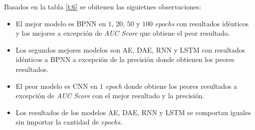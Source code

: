 Basados en la tabla \ref{t:6} se obitenen las siguietnes observaciones:
\begin{itemize}
	\item El mejor modelo es BPNN en $1$, $20$, $50$ y $100$ \textit{epochs} con resultados id\'{e}nticos y los mejores a excepci\'{o}n de \textit{AUC Score} que obtiene el peor resultado.
	\item Los segundos mejores modelos son AE, DAE, RNN y LSTM con resultados id\'{e}nticos a BPNN a excepci\'{o}n de la precisi\'{o}n donde obtienen los peores resultados.
	\item El peor modelo es CNN en $1$ \textit{epoch} donde obtiene los peores resultados a excepci\'{o}n de \textit{AUC Score} con el mejor resultado y la precisi\'{o}n.
	\item Los resultados de los modelos AE, DAE, RNN y LSTM se comportan iguales sin importar la cantidad de \textit{epochs}.
\end{itemize}

